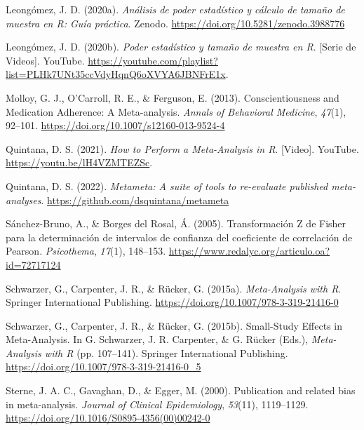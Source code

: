 \documentclass[
  bookmarksnumbered]{article}
\newlength{\cslhangindent}
\newlength{\cslentryspacingunit} %
\newenvironment{CSLReferences}[2] %
 {%
  \setlength{\parindent}{0pt}
  \ifodd #1
  \let\oldpar\par
  \def\par{\hangindent=\cslhangindent\oldpar}
  \fi
  \setlength{\parskip}{#2\cslentryspacingunit}
 }%
 {}
\begin{document}
\begin{CSLReferences}{1}{0}
\leavevmode{}%
Leongómez, J. D. (2020a). \emph{Análisis de poder estadístico y cálculo de tamaño de muestra en {R}: {Guía} práctica}. {Zenodo}. \url{https://doi.org/10.5281/zenodo.3988776}

\leavevmode{}%
Leongómez, J. D. (2020b). \emph{Poder estadístico y tamaño de muestra en {R}}. {[}Serie de Videos{]}. YouTube. \url{https://youtube.com/playlist?list=PLHk7UNt35ccVdyHqnQ6oXVYA6JBNFrE1x}.

\leavevmode{}%
Molloy, G. J., O'Carroll, R. E., \& Ferguson, E. (2013). Conscientiousness and Medication Adherence: A Meta-analysis. \emph{Annals of Behavioral Medicine}, \emph{47}(1), 92--101. \url{https://doi.org/10.1007/s12160-013-9524-4}

\leavevmode{}%
Quintana, D. S. (2021). \emph{{How to Perform a Meta-Analysis in R}}. {[}Video{]}. YouTube. \url{https://youtu.be/lH4VZMTEZSc}.

\leavevmode{}%
Quintana, D. S. (2022). \emph{Metameta: A suite of tools to re-evaluate published meta-analyses}. \url{https://github.com/dsquintana/metameta}

\leavevmode{}%
Sánchez-Bruno, A., \& Borges del Rosal, Á. (2005). {Transformación Z de Fisher para la determinación de intervalos de confianza del coeficiente de correlación de Pearson}. \emph{Psicothema}, \emph{17}(1), 148--153. \url{https://www.redalyc.org/articulo.oa?id=72717124}

\leavevmode{}%
Schwarzer, G., Carpenter, J. R., \& Rücker, G. (2015a). \emph{Meta-{Analysis} with {R}}. {Springer International Publishing}. \url{https://doi.org/10.1007/978-3-319-21416-0}

\leavevmode{}%
Schwarzer, G., Carpenter, J. R., \& Rücker, G. (2015b). Small-{Study Effects} in {Meta}-{Analysis}. In G. Schwarzer, J. R. Carpenter, \& G. Rücker (Eds.), \emph{Meta-{Analysis} with {R}} (pp. 107--141). {Springer International Publishing}. \url{https://doi.org/10.1007/978-3-319-21416-0_5}

\leavevmode{}%
Sterne, J. A. C., Gavaghan, D., \& Egger, M. (2000). Publication and related bias in meta-analysis. \emph{Journal of Clinical Epidemiology}, \emph{53}(11), 1119--1129. \url{https://doi.org/10.1016/S0895-4356(00)00242-0}


\end{CSLReferences}
\end{document}

